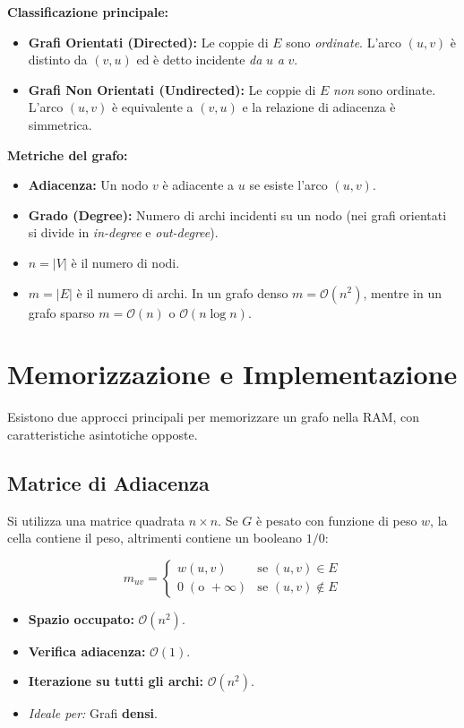 \documentclass[12pt, a4paper]{article}
\begin{document}
\textbf{Classificazione principale:}
\begin{itemize}
\item \textbf{Grafi Orientati (Directed):} Le coppie di $E$ sono \textit{ordinate}. L'arco $(u, v)$ è distinto da $(v, u)$ ed è detto incidente \textit{da} $u$ \textit{a} $v$.
\item \textbf{Grafi Non Orientati (Undirected):} Le coppie di $E$ \textit{non} sono ordinate. L'arco $(u, v)$ è equivalente a $(v, u)$ e la relazione di adiacenza è simmetrica.
\end{itemize}

\textbf{Metriche del grafo:}
\begin{itemize}
\item \textbf{Adiacenza:} Un nodo $v$ è adiacente a $u$ se esiste l'arco $(u, v)$.
\item \textbf{Grado (Degree):} Numero di archi incidenti su un nodo (nei grafi orientati si divide in \textit{in-degree} e \textit{out-degree}).
\item $n = \vert{}V\vert{}$ è il numero di nodi.
\item $m = \vert{}E\vert{}$ è il numero di archi. In un grafo denso $m = \mathcal{O}(n^2)$, mentre in un grafo sparso $m = \mathcal{O}(n)$ o $\mathcal{O}(n \log n)$.
\end{itemize}

\newpage

\section{Memorizzazione e Implementazione}

Esistono due approcci principali per memorizzare un grafo nella RAM, con caratteristiche asintotiche opposte.

\subsection{Matrice di Adiacenza}
Si utilizza una matrice quadrata $n \times n$. Se $G$ è pesato con funzione di peso $w$, la cella contiene il peso, altrimenti contiene un booleano $1/0$:


$$m_{uv} = \begin{cases} w(u,v) & \text{se } (u,v) \in E \\ 0 \; (\text{o } +\infty) & \text{se } (u,v) \notin E \end{cases}$$


\begin{itemize}
\item \textbf{Spazio occupato:} $\mathcal{O}(n^2)$.
\item \textbf{Verifica adiacenza:} $\mathcal{O}(1)$.
\item \textbf{Iterazione su tutti gli archi:} $\mathcal{O}(n^2)$.
\item \textit{Ideale per:} Grafi \textbf{densi}.
\end{itemize}
\end{document}
